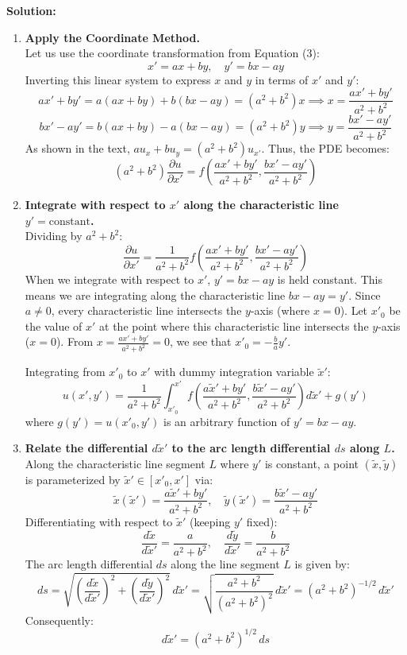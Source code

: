 \documentclass[11pt]{article}
\begin{document}
\textbf{Solution:}
\begin{enumerate}[label=\textbf{Step \arabic*:}]
    \item \textbf{Apply the Coordinate Method.} \\
    Let us use the coordinate transformation from Equation (3):
    \[
    x' = ax + by, \quad y' = bx - ay
    \]
    Inverting this linear system to express $x$ and $y$ in terms of $x'$ and $y'$:
    \[
    ax' + by' = a(ax + by) + b(bx - ay) = (a^2 + b^2)x \implies x = \frac{ax' + by'}{a^2 + b^2}
    \]
    \[
    bx' - ay' = b(ax + by) - a(bx - ay) = (a^2 + b^2)y \implies y = \frac{bx' - ay'}{a^2 + b^2}
    \]
    As shown in the text, $au_x + bu_y = (a^2 + b^2)u_{x'}$. Thus, the PDE becomes:
    \[
    (a^2 + b^2)\frac{\partial u}{\partial x'} = f\left(\frac{ax' + by'}{a^2 + b^2}, \frac{bx' - ay'}{a^2 + b^2}\right)
    \]

    \item \textbf{Integrate with respect to $x'$ along the characteristic line $y' = \text{constant}$.} \\
    Dividing by $a^2 + b^2$:
    \[
    \frac{\partial u}{\partial x'} = \frac{1}{a^2 + b^2} f\left(\frac{ax' + by'}{a^2 + b^2}, \frac{bx' - ay'}{a^2 + b^2}\right)
    \]
    When we integrate with respect to $x'$, $y' = bx - ay$ is held constant. This means we are integrating along the characteristic line $bx - ay = y'$. Since $a \neq 0$, every characteristic line intersects the $y$-axis (where $x = 0$). Let $x'_0$ be the value of $x'$ at the point where this characteristic line intersects the $y$-axis ($x = 0$). From $x = \frac{ax' + by'}{a^2 + b^2} = 0$, we see that $x'_0 = -\frac{b}{a}y'$.
    
    Integrating from $x'_0$ to $x'$ with dummy integration variable $\tilde{x}'$:
    \[
    u(x', y') = \frac{1}{a^2 + b^2}\int_{x'_0}^{x'} f\left(\frac{a\tilde{x}' + by'}{a^2 + b^2}, \frac{b\tilde{x}' - ay'}{a^2 + b^2}\right)d\tilde{x}' + g(y')
    \]
    where $g(y') = u(x'_0, y')$ is an arbitrary function of $y' = bx - ay$.

    \item \textbf{Relate the differential $d\tilde{x}'$ to the arc length differential $ds$ along $L$.} \\
    Along the characteristic line segment $L$ where $y'$ is constant, a point $(\tilde{x}, \tilde{y})$ is parameterized by $\tilde{x}' \in [x'_0, x']$ via:
    \[
    \tilde{x}(\tilde{x}') = \frac{a\tilde{x}' + by'}{a^2 + b^2}, \quad \tilde{y}(\tilde{x}') = \frac{b\tilde{x}' - ay'}{a^2 + b^2}
    \]
    Differentiating with respect to $\tilde{x}'$ (keeping $y'$ fixed):
    \[
    \frac{d\tilde{x}}{d\tilde{x}'} = \frac{a}{a^2 + b^2}, \quad \frac{d\tilde{y}}{d\tilde{x}'} = \frac{b}{a^2 + b^2}
    \]
    The arc length differential $ds$ along the line segment $L$ is given by:
    \[
    ds = \sqrt{\left(\frac{d\tilde{x}}{d\tilde{x}'}\right)^2 + \left(\frac{d\tilde{y}}{d\tilde{x}'}\right)^2}\,d\tilde{x}' = \sqrt{\frac{a^2 + b^2}{(a^2 + b^2)^2}}\,d\tilde{x}' = (a^2 + b^2)^{-1/2}\,d\tilde{x}'
    \]
    Consequently:
    \[
    d\tilde{x}' = (a^2 + b^2)^{1/2}\,ds
    \]


\end{enumerate}
\end{document}
